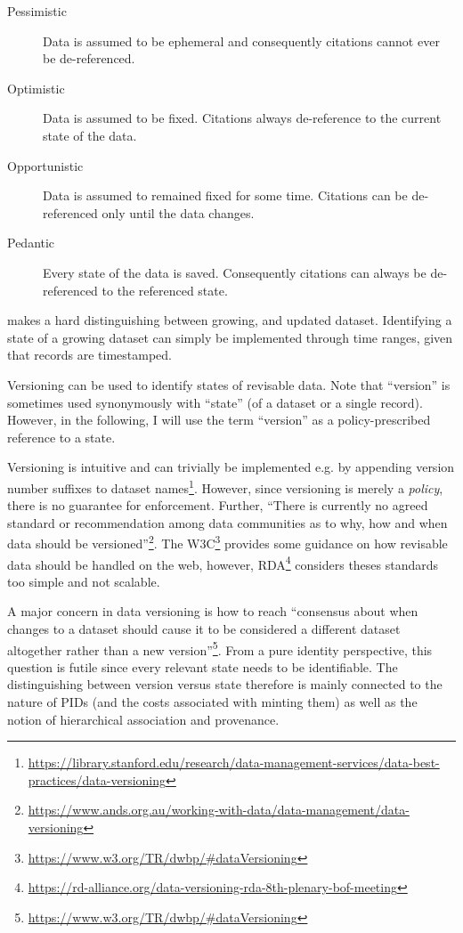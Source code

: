 \documentclass[a4paper,10pt]{article}
\begin{document}
\begin{description}
  \item[Pessimistic] Data is assumed to be ephemeral and consequently citations cannot ever be de-referenced.
  \item[Optimistic] Data is assumed to be fixed. Citations always de-reference to the current state of the data.
  \item[Opportunistic] Data is assumed to remained fixed for some time. Citations can be de-referenced only until the data changes.
  \item[Pedantic] Every state of the data is saved. Consequently citations can always be de-referenced to the referenced state.  
\end{description}

\citep{Klump2016} makes a hard distinguishing between growing, and updated dataset. Identifying a state of a growing dataset can simply be implemented through time ranges, given that records are timestamped. 

Versioning can be used to identify states of revisable data. Note that ``version'' is sometimes used synonymously with ``state'' (of a dataset or a single record). However, in the following, I will use the term ``version'' as a policy-prescribed reference to a state.

Versioning is intuitive and can trivially be implemented e.g. by appending version number suffixes to dataset names\footnote{\url{https://library.stanford.edu/research/data-management-services/data-best-practices/data-versioning}}. 
However, since versioning is merely a \textit{policy}, there is no guarantee for enforcement. Further, ``There is currently no agreed standard or recommendation among data communities as to why, how and when data should be versioned''\footnote{\url{https://www.ands.org.au/working-with-data/data-management/data-versioning}}.
The W3C\footnote{\url{https://www.w3.org/TR/dwbp/\#dataVersioning}} provides some guidance on how revisable data should be handled on the web, however, \gls{RDA}\footnote{\url{https://rd-alliance.org/data-versioning-rda-8th-plenary-bof-meeting}} considers theses standards too simple and not scalable.

A major concern in data versioning is how to reach ``consensus about when changes to a dataset should cause it to be considered a different dataset altogether rather than a new version''\footnote{\url{https://www.w3.org/TR/dwbp/\#dataVersioning}}.
From a pure identity perspective, this question is futile since every relevant state needs to be identifiable. The distinguishing between version versus state therefore is mainly connected to the nature of \glspl{PID} (and the costs associated with minting them) \citep{Klump2016} as well as the notion of hierarchical association and provenance. 
\end{document}

